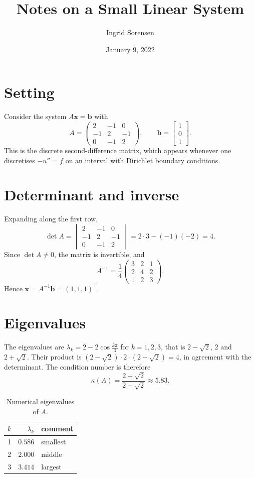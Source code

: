 \documentclass[11pt,a4paper]{article}
\title{Notes on a Small Linear System}
\author{Ingrid Sorensen}
\date{January 9, 2022}
\begin{document}
\maketitle

\section{Setting}
Consider the system $A\mathbf{x}=\mathbf{b}$ with
\[
  A=\begin{pmatrix} 2 & -1 & 0\\ -1 & 2 & -1\\ 0 & -1 & 2\end{pmatrix},\qquad
  \mathbf{b}=\begin{bmatrix}1\\0\\1\end{bmatrix}.
\]
This is the discrete second-difference matrix, which appears whenever one discretises $-u''=f$ on an interval with Dirichlet boundary conditions.

\section{Determinant and inverse}
Expanding along the first row,
\begin{equation}
  \det A=\begin{vmatrix} 2 & -1 & 0\\ -1 & 2 & -1\\ 0 & -1 & 2\end{vmatrix}
  = 2\cdot3-(-1)(-2)=4 .
\end{equation}
Since $\det A\ne0$, the matrix is invertible, and
\[
  A^{-1}=\frac14\begin{pmatrix}3&2&1\\2&4&2\\1&2&3\end{pmatrix}.
\]
Hence $\mathbf{x}=A^{-1}\mathbf{b}=(1,1,1)^{\mathsf T}$.

\section{Eigenvalues}
The eigenvalues are $\lambda_k = 2-2\cos\frac{k\pi}{4}$ for $k=1,2,3$, that is
$2-\sqrt2$, $2$ and $2+\sqrt2$. Their product is $(2-\sqrt2)\cdot2\cdot(2+\sqrt2)=4$, in agreement with the determinant. The condition number is therefore
\[
  \kappa(A)=\frac{2+\sqrt2}{2-\sqrt2}\approx 5.83 .
\]

\begin{table}[h]
\centering
\begin{tabular}{|c|r|l|}
\hline
$k$ & $\lambda_k$ & comment\\
\hline
1 & $0.586$ & smallest\\
2 & $2.000$ & middle\\
3 & $3.414$ & largest\\
\hline
\end{tabular}
\caption{Numerical eigenvalues of $A$.}\label{tab:eig}
\end{table}
\end{document}
